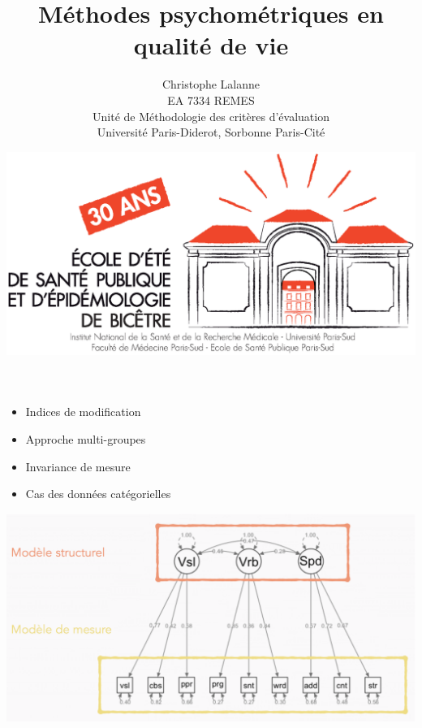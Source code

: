 

\title{Méthodes psychométriques en qualité de vie}
\author{Christophe Lalanne\\EA 7334 REMES\\ Unité de Méthodologie des critères d’évaluation\\Université Paris-Diderot, Sorbonne Paris-Cité\\}
\date{\includegraphics[height=18ex]{logo.eps}}




\LogoOff
\maketitle
\rightfooter{\quad\textsf{\thepage}}



\begin{itemize}
\item Indices de modification
\item Approche multi-groupes
\item Invariance de mesure
\item Cas des données catégorielles
\end{itemize}




{\centering \includegraphics[width=.85\textwidth]{figs/HS3.eps}\par}

